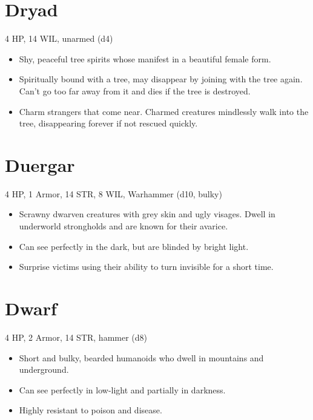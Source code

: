 \documentclass[
  10pt,
  american,
]{article}
\begin{document}
\hypertarget{dryad}{%
\section{Dryad}\label{dryad}}

4 HP, 14 WIL, unarmed (d4)

\begin{samepage}
\begin{itemize}
\setlength\itemsep{-.5em}
\item Shy, peaceful tree spirits whose manifest in a beautiful female form.
\item Spiritually bound with a tree, may disappear by joining with the tree again. Can’t go too far away from it and dies if the tree is destroyed.
\item Charm strangers that come near. Charmed creatures mindlessly walk into the tree, disappearing forever if not rescued quickly.
\end{itemize}
\end{samepage}

\hypertarget{duergar}{%
\section{Duergar}\label{duergar}}

4 HP, 1 Armor, 14 STR, 8 WIL, Warhammer (d10, bulky)

\begin{samepage}
\begin{itemize}
\setlength\itemsep{-.5em}
\item Scrawny dwarven creatures with grey skin and ugly visages.   Dwell in underworld strongholds and are known for their avarice.
\item Can see perfectly in the dark, but are blinded by bright light.
\item Surprise victims using their ability to turn invisible for a short time.
\end{itemize}
\end{samepage}

\hypertarget{dwarf}{%
\section{Dwarf}\label{dwarf}}

4 HP, 2 Armor, 14 STR, hammer (d8)

\begin{samepage}
\begin{itemize}
\setlength\itemsep{-.5em}
\item Short and bulky, bearded humanoids who dwell in mountains and underground.
\item Can see perfectly in low-light and partially in darkness.
\item Highly resistant to poison and disease.
\end{itemize}
\end{samepage}
\end{document}
